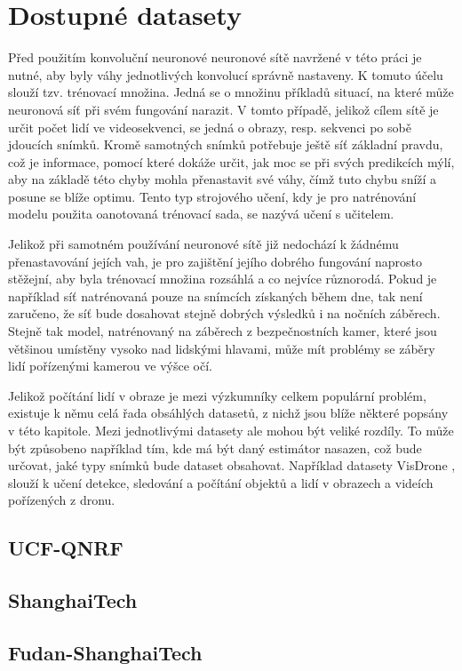 \chapter{Dostupné datasety}
\label{sec:Datasets}
Před použitím konvoluční neuronové neuronové sítě navržené v této práci je nutné, aby byly váhy jednotlivých konvolucí správně nastaveny.
K tomuto účelu slouží tzv. trénovací množina.
Jedná se o množinu příkladů situací, na které může neuronová síť při svém fungování narazit.
V tomto případě, jelikož cílem sítě je určit počet lidí ve videosekvenci, se jedná o obrazy, resp. sekvenci po sobě jdoucích snímků.
Kromě samotných snímků potřebuje ještě síť základní pravdu, což je informace, pomocí které dokáže určit, jak moc se při svých predikcích mýlí, aby na základě této chyby mohla přenastavit své váhy, čímž tuto chybu sníží a posune se blíže optimu.
Tento typ strojového učení, kdy je pro natrénování modelu použita oanotovaná trénovací sada, se nazývá učení s učitelem.

Jelikož při samotném používání neuronové sítě již nedochází k žádnému přenastavování jejích vah, je pro zajištění jejího dobrého fungování naprosto stěžejní, aby byla trénovací množina rozsáhlá a co nejvíce různorodá.
Pokud je například síť natrénovaná pouze na snímcích získaných během dne, tak není zaručeno, že síť bude dosahovat stejně dobrých výsledků i na nočních záběrech.
Stejně tak model, natrénovaný na záběrech z bezpečnostních kamer, které jsou většinou umístěny vysoko nad lidskými hlavami, může mít problémy se záběry lidí pořízenými kamerou ve výšce očí.

Jelikož počítání lidí v obraze je mezi výzkumníky celkem populární problém, existuje k němu celá řada obsáhlých datasetů, z nichž jsou blíže některé popsány v této kapitole.
Mezi jednotlivými datasety ale mohou být veliké rozdíly.
To může být způsobeno například tím, kde má být daný estimátor nasazen, což bude určovat, jaké typy snímků bude dataset obsahovat.
Například datasety VisDrone \cite{VisDrone-Dataset-1, VisDrone-Dataset-2}, slouží k učení detekce, sledování a počítání objektů a lidí v obrazech a videích pořízených z dronu.





\section{UCF-QNRF}

\section{ShanghaiTech}

\section{Fudan-ShanghaiTech}

\endinput